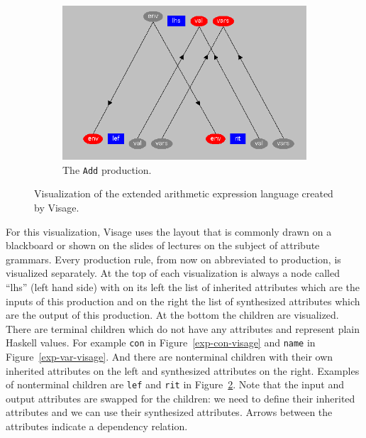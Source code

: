 \documentclass[11pt]{article}
\begin{document}
\begin{figure}[H]
  \vspace{1em}
  \begin{subfigure}[b]{\textwidth}
    \centering
    \includegraphics[scale=0.7]{exp-add-visage}
    \caption{The \texttt{Add} production.}
    \label{exp-add-visage}
  \end{subfigure}
  \caption{Visualization of the extended arithmetic expression language created by Visage.}
\end{figure}

For this visualization, Visage uses the layout that is commonly drawn on a blackboard or shown on the slides of lectures on the subject of attribute grammars. Every production rule, from now on abbreviated to production, is visualized separately. At the top of each visualization is always a node called ``lhs'' (left hand side) with on its left the list of inherited attributes which are the inputs of this production and on the right the list of synthesized attributes which are the output of this production. At the bottom the children are visualized. There are terminal children which do not have any attributes and represent plain Haskell values. For example \texttt{con} in Figure~\ref{exp-con-visage} and \texttt{name} in Figure~\ref{exp-var-visage}. And there are nonterminal children with their own inherited attributes on the left and synthesized attributes on the right. Examples of nonterminal children are \texttt{lef} and \texttt{rit} in Figure~\ref{exp-add-visage}. Note that the input and output attributes are swapped for the children: we need to define their inherited attributes and we can use their synthesized attributes. Arrows between the attributes indicate a dependency relation.
\end{document}

